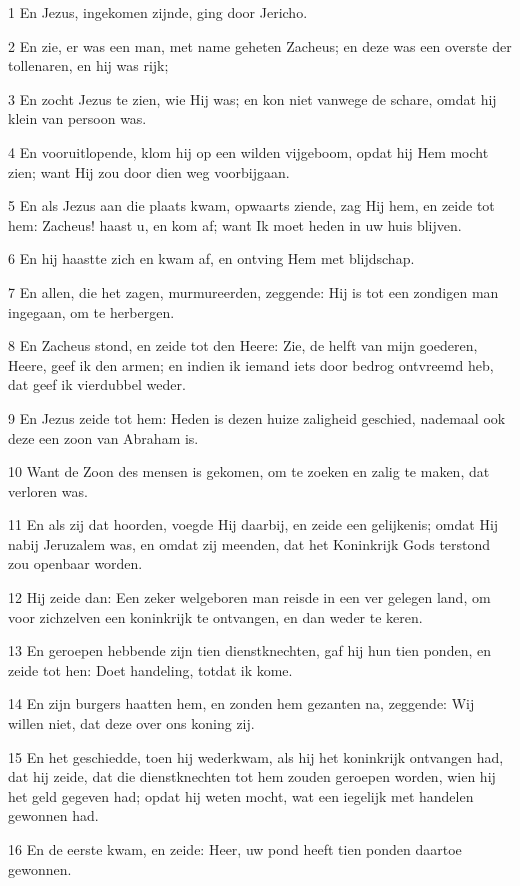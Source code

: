 \par 1 En Jezus, ingekomen zijnde, ging door Jericho.
\par 2 En zie, er was een man, met name geheten Zacheus; en deze was een overste der tollenaren, en hij was rijk;
\par 3 En zocht Jezus te zien, wie Hij was; en kon niet vanwege de schare, omdat hij klein van persoon was.
\par 4 En vooruitlopende, klom hij op een wilden vijgeboom, opdat hij Hem mocht zien; want Hij zou door dien weg voorbijgaan.
\par 5 En als Jezus aan die plaats kwam, opwaarts ziende, zag Hij hem, en zeide tot hem: Zacheus! haast u, en kom af; want Ik moet heden in uw huis blijven.
\par 6 En hij haastte zich en kwam af, en ontving Hem met blijdschap.
\par 7 En allen, die het zagen, murmureerden, zeggende: Hij is tot een zondigen man ingegaan, om te herbergen.
\par 8 En Zacheus stond, en zeide tot den Heere: Zie, de helft van mijn goederen, Heere, geef ik den armen; en indien ik iemand iets door bedrog ontvreemd heb, dat geef ik vierdubbel weder.
\par 9 En Jezus zeide tot hem: Heden is dezen huize zaligheid geschied, nademaal ook deze een zoon van Abraham is.
\par 10 Want de Zoon des mensen is gekomen, om te zoeken en zalig te maken, dat verloren was.
\par 11 En als zij dat hoorden, voegde Hij daarbij, en zeide een gelijkenis; omdat Hij nabij Jeruzalem was, en omdat zij meenden, dat het Koninkrijk Gods terstond zou openbaar worden.
\par 12 Hij zeide dan: Een zeker welgeboren man reisde in een ver gelegen land, om voor zichzelven een koninkrijk te ontvangen, en dan weder te keren.
\par 13 En geroepen hebbende zijn tien dienstknechten, gaf hij hun tien ponden, en zeide tot hen: Doet handeling, totdat ik kome.
\par 14 En zijn burgers haatten hem, en zonden hem gezanten na, zeggende: Wij willen niet, dat deze over ons koning zij.
\par 15 En het geschiedde, toen hij wederkwam, als hij het koninkrijk ontvangen had, dat hij zeide, dat die dienstknechten tot hem zouden geroepen worden, wien hij het geld gegeven had; opdat hij weten mocht, wat een iegelijk met handelen gewonnen had.
\par 16 En de eerste kwam, en zeide: Heer, uw pond heeft tien ponden daartoe gewonnen.
